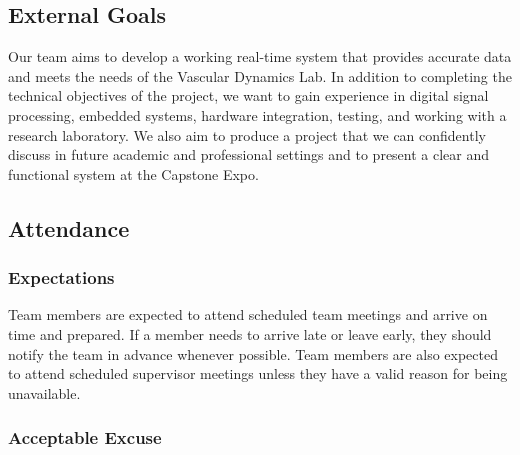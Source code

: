 \documentclass{article}
\begin{document}

\subsection*{External Goals}


Our team aims to develop a working real-time system that provides accurate data and meets the needs of the Vascular Dynamics Lab. In addition to completing the technical objectives of the project, we want to gain experience in digital signal processing, embedded systems, hardware integration, testing, and working with a research laboratory. We also aim to produce a project that we can confidently discuss in future academic and professional settings and to present a clear and functional system at the Capstone Expo.

\subsection*{Attendance}

\subsubsection*{Expectations}


Team members are expected to attend scheduled team meetings and arrive on time and prepared. If a member needs to arrive late or leave early, they should notify the team in advance whenever possible. Team members are also expected to attend scheduled supervisor meetings unless they have a valid reason for being unavailable.

\subsubsection*{Acceptable Excuse}

\end{document}

